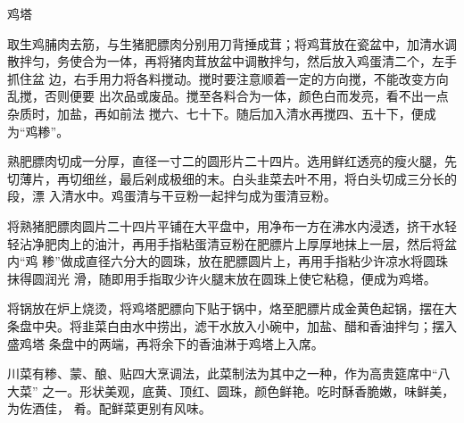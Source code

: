 \begin{recipe}[金钱鸡塔]{鸡塔}

\ingredients


\preparation

\step 取生鸡脯肉去筋，与生猪肥膘肉分别用刀背捶成茸；将鸡茸放在瓷盆中，加清水调
散拌匀，务使合为一体，再将猪肉茸放盆中调散拌匀，然后放入鸡蛋清二个，左手抓住盆
边，右手用力将各料搅动。搅时要注意顺着一定的方向搅，不能改变方向乱搅，否则便要
出次品或废品。搅至各料合为一体，颜色白而发亮，看不出一点杂质时，加盐，再如前法
搅六、七十下。随后加入清水再搅四、五十下，便成为“鸡糁”。

\step 熟肥膘肉切成一分厚，直径一寸二的圆形片二十四片。选用鲜红透亮的瘦火腿，先
切薄片，再切细丝，最后剁成极细的末。白头韭菜去叶不用，将白头切成三分长的段，漂
入清水中。鸡蛋清与干豆粉一起拌匀成为蛋清豆粉。

\step 将熟猪肥膘肉圆片二十四片平铺在大平盘中，用净布一方在沸水内浸透，挤干水轻
轻沾净肥肉上的油汁，再用手指粘蛋清豆粉在肥膘片上厚厚地抹上一层，然后将盆内“鸡
糁”做成直径六分大的圆珠，放在肥膘圆片上，再用手指粘少许凉水将圆珠抹得圆润光
滑，随即用手指取少许火腿末放在圆珠上使它粘稳，便成为鸡塔。

\step 将锅放在炉上烧烫，将鸡塔肥膘向下贴于锅中，烙至肥膘片成金黄色起锅，摆在大
条盘中央。将韭菜白由水中捞出，滤干水放入小碗中，加盐、醋和香油拌匀；摆入盛鸡塔
条盘中的两端，再将余下的香油淋于鸡塔上入席。

\features

川菜有糁、蒙、酿、贴四大烹调法，此菜制法为其中之一种，作为高贵筵席中“八大菜”
之一。形状美观，底黄、顶红、圆珠，颜色鲜艳。吃时酥香脆嫩，味鲜美，为佐酒佳，
肴。配鲜菜更别有风味。

\end{recipe}

